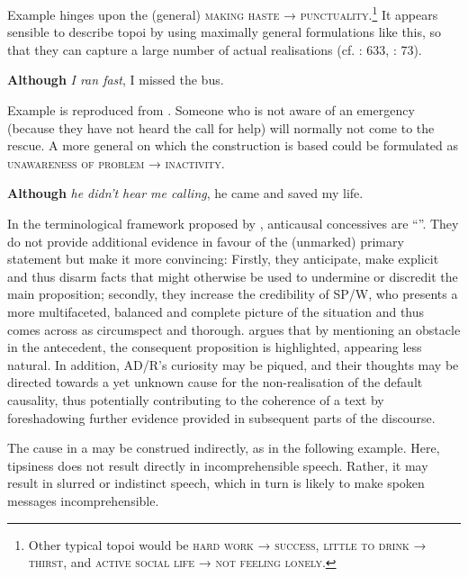 Example  hinges upon the (general)  \textsc{making haste} → \textsc{punctuality}.\footnote{Other typical topoi would be \textsc{hard work} → \textsc{success}, \textsc{little to drink} → \textsc{thirst}, and \textsc{active social life} → \textsc{not feeling lonely}.} It appears sensible to describe topoi by using maximally general formulations like this, so that they can capture a large number of actual realisations (cf. \citealt{König1991b}: 633, \citealt{Hermodsson1994}: 73).

\ea\label{ex:12}   \label{bkm:Ref470956499}\textbf{Although} \textit{I ran fast}, I missed the bus.
\z

Example  is reproduced from \citet[79]{Sweetser1990}. Someone who is not aware of an emergency (because they have not heard the call for help) will normally not come to the rescue. A more general  on which the construction is based could be formulated as \textsc{unawareness of problem} → \textsc{inactivity}.

\ea\label{ex:13}   \label{bkm:Ref489004948}\textbf{Although} \textit{he didn’t hear me calling}, he came and saved my life.
\z

In the terminological framework proposed by \citet[308]{Azar1997}, anticausal concessives are “”. They do not provide additional evidence in favour of the (unmarked) primary statement but make it more convincing: Firstly, they anticipate, make explicit and thus disarm facts that might otherwise be used to undermine or discredit the main proposition; secondly, they increase the credibility of SP/W, who presents a more multifaceted, balanced and complete picture of the situation and thus comes across as circumspect and thorough.  argues that by mentioning an obstacle in the antecedent, the consequent proposition is highlighted, appearing less natural. In addition, AD/R’s curiosity may be piqued, and their thoughts may be directed towards a yet unknown cause for the non-realisation of the default causality, thus potentially contributing to the coherence of a text by foreshadowing further evidence provided in subsequent parts of the discourse.

 The cause in a  may be construed indirectly, as in the following example. Here, tipsiness does not result directly in incomprehensible speech. Rather, it may result in slurred or indistinct speech, which in turn is likely to make spoken messages incomprehensible.

